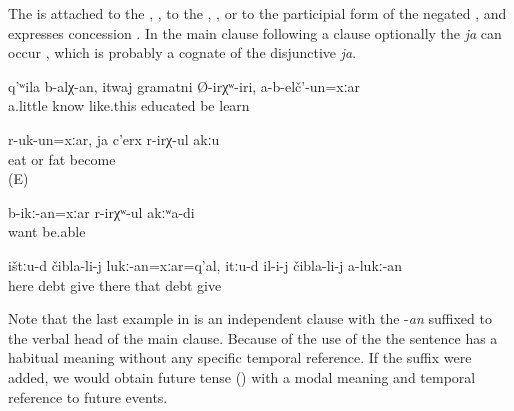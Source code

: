 The    is attached to the  , , to the  , , or to the participial form of the negated , and expresses concession . In the main clause following a  clause optionally the  \textit{ja} can occur , which is probably a cognate of the disjunctive  \textit{ja}.
%
\begin{exe}
	\ex	\label{ex:Knowledgeable, he was educated even if he did not study}
	\gll	q'ʷila	b-alχ-an,	itwaj	gramatni	Ø-irχʷ-iri,	a-b-elč'-un=xːar\\
		a.little	know	like.this	educated	be	learn\\
	\glt	{}

	\ex	\label{ex:Although she eats, she does not get fat}
	\gll	r-uk-un=xːar,	ja	c'erx	r-irχ-ul	akːu\\
		eat	or	fat	become	\\
	\glt	{} (E)

	\ex	\label{ex:‎Although I want, I cannot}
	\gll	b-ikː-an=xːar	r-irχʷ-ul	akːʷa-di\\
		want	be.able	\\
	\glt	{}

	\ex	\label{ex:‎T‎hough they give here (stuff) for debts, there they do not give him (food) for debts}
	\gll	ištːu-d	čibla-li-j	lukː-an=xːar=q'al,	itːu-d	il-i-j	čibla-li-j	a-lukː-an\\
		here	debt	give	there	that\tsc{-obl-dat}	debt	give\\
	\glt	{}
\end{exe}

Note that the last example in  is an independent clause with the  -\textit{an} suffixed to the verbal head of the main clause. Because of the use of the  the sentence has a habitual meaning without any specific temporal reference. If the suffix  were added, we would obtain future tense () with a modal meaning and temporal reference to future events.

